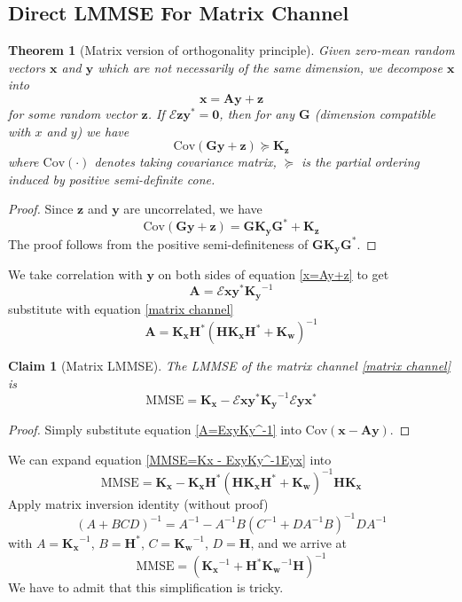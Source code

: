 \documentclass[12pt]{article}
\newtheorem{theorem}{Theorem}
\newtheorem{claim}{Claim}
\theoremstyle{definition}
\begin{document}
\subsection{Direct LMMSE For Matrix Channel}
\begin{theorem}[Matrix version of orthogonality principle]
	Given zero-mean random vectors $\bm{x}$ and $\bm{y}$ which are not necessarily of the same dimension, we decompose $\bm{x}$ into
	\begin{equation}
		\bm{x} = \bm{Ay}+\bm{z}\label{x=Ay+z}
	\end{equation}
	for some random vector $\bm{z}$. If $\mathcal{E}\bm{z}\bm{y}^*=\bm{0}$, then for any $\bm{G}$ (dimension compatible with $x$ and $y$) we have
	$$\mbox{Cov}(\bm{Gy}+\bm{z})\succeq\bm{K_z}$$
	where $\mbox{Cov}(\cdot)$ denotes taking covariance matrix, $\succeq$ is the partial ordering induced by positive semi-definite cone.
\end{theorem}
\begin{proof}
	Since $\bm{z}$ and $\bm{y}$ are uncorrelated, we have
	$$\mbox{Cov}(\bm{Gy}+\bm{z})=\bm{G}\bm{K_y}\bm{G}^*+\bm{K_z}$$
	The proof follows from the positive semi-definiteness of $\bm{G}\bm{K_y}\bm{G}^*$.
\end{proof}
We take correlation with $\bm{y}$ on both sides of equation \ref{x=Ay+z} to get
\begin{equation}
	\bm{A}=\mathcal{E}\bm{x}\bm{y}^*\bm{K_y}^{-1}\label{A=ExyKy^-1}
\end{equation}
substitute with equation \ref{matrix channel}
\begin{equation}
	\bm{A} = \bm{K_xH}^*\left(\bm{HK_xH^*}+\bm{K_w}\right)^{-1}
\end{equation}
\begin{claim}[Matrix LMMSE]
	The LMMSE of the matrix channel \ref{matrix channel} is
	\begin{equation}
		\mbox{MMSE} = \bm{K_x}-\mathcal{E}\bm{xy}^*\bm{K_y}^{-1}\mathcal{E}\bm{yx}^*\label{MMSE=Kx - ExyKy^-1Eyx}
	\end{equation}
\end{claim}
\begin{proof}
	Simply substitute equation \ref{A=ExyKy^-1} into $\mbox{Cov}(\bm{x}-\bm{Ay})$.
\end{proof}
We can expand equation \ref{MMSE=Kx - ExyKy^-1Eyx} into
$$\mbox{MMSE}=\bm{K_x}-\bm{K_xH}^*\left(\bm{HK_xH}^*+\bm{K_w}\right)^{-1}\bm{HK_x}$$
Apply matrix inversion identity (without proof)
$$(A+BCD)^{-1}=A^{-1}-A^{-1}B(C^{-1}+DA^{-1}B)^{-1}DA^{-1}$$
with $A=\bm{K_x}^{-1}$, $B=\bm{H}^*$, $C=\bm{K_w}^{-1}$, $D=\bm{H}$, and we arrive at
$$\mbox{MMSE}=\left(\bm{K_x}^{-1}+\bm{H}^*\bm{K_w}^{-1}\bm{H}\right)^{-1}$$
We have to admit that this simplification is tricky.
\end{document}
